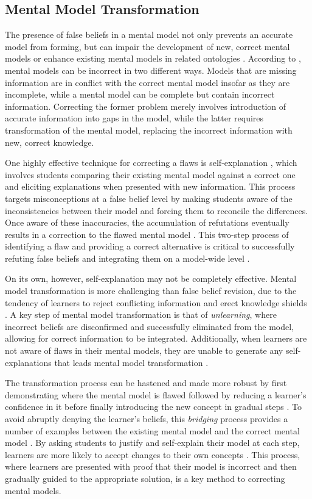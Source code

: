\subsection{Mental Model Transformation}

The presence of false beliefs in a mental model not only prevents an accurate model from forming, but can impair the development of new, correct mental models or enhance existing mental models in related ontologies \citep{Jacobson2013}. According to \citet{Chi2008}, mental models can be incorrect in two different ways. Models that are missing information are in conflict with the correct mental model insofar as they are incomplete, while a mental model can be complete but contain incorrect information. Correcting the former problem merely involves introduction of accurate information into gaps in the model, while the latter requires transformation of the mental model, replacing the incorrect information with new, correct knowledge.

One highly effective technique for correcting a flaws is self-explanation \citep{Chi1994}, which involves students comparing their existing mental model against a correct one and eliciting explanations when presented with new information. This process targets misconceptions at a false belief level by making students aware of the inconsistencies between their model and forcing them to reconcile the differences. Once aware of these inaccuracies, the accumulation of refutations eventually results in a correction to the flawed mental model \citep{Chi2008}. This two-step process of identifying a flaw and providing a correct alternative is critical to successfully refuting false beliefs and integrating them on a model-wide level \citep{Chi1994, Klein2006}.

On its own, however, self-explanation may not be completely effective. Mental model transformation is more challenging than false belief revision, due to the tendency of learners to reject conflicting information and erect knowledge shields \citep{Klein2006}. A key step of mental model transformation is that of \emph{unlearning}, where incorrect beliefs are disconfirmed and successfully eliminated from the model, allowing for correct information to be integrated. Additionally, when learners are not aware of flaws in their mental models, they are unable to generate any self-explanations \citep{Chi2002} that leads mental model transformation \citep{Chi2008}.

The transformation process can be hastened and made more robust by first demonstrating where the mental model is flawed followed by reducing a learner's confidence in it before finally introducing the new concept in gradual steps \citep{Klein2006}. To avoid abruptly denying the learner's beliefs, this \emph{bridging} process provides a number of examples between the existing mental model and the correct mental model \citep{Brown1989}. By asking students to justify and self-explain their model at each step, learners are more likely to accept changes to their own concepts \citep{Brown1989, Chi2008, Chi1994, Klein2006}. This process, where learners are presented with proof that their model is incorrect and then gradually guided to the appropriate solution, is a key method to correcting mental models.

